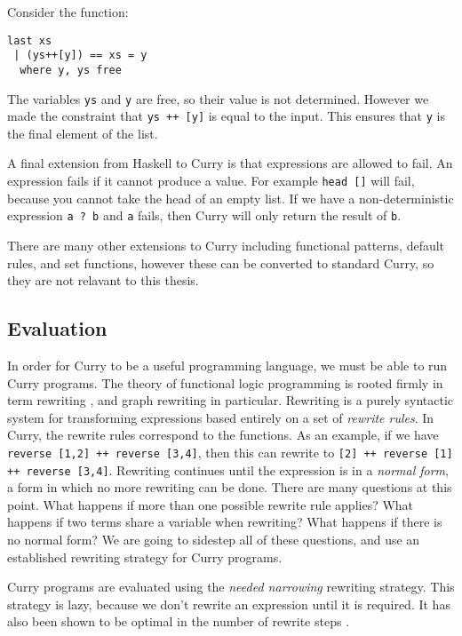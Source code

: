 Consider the function:
\begin{verbatim}
last xs
 | (ys++[y]) == xs = y
  where y, ys free
\end{verbatim}

The variables \texttt{ys} and \texttt y are free, so their value is not determined.
However we made the constraint that \texttt{ys ++ [y]} is equal to the input.
This ensures that \texttt y is the final element of the list.

A final extension from Haskell to Curry is that expressions are allowed to fail.
An expression fails if it cannot produce a value.
For example \texttt{head []} will fail, because you cannot take the head of an empty list.
If we have a non-deterministic expression \texttt{a ? b} and \texttt a fails, then Curry will only return the result of \texttt b.

There are many other extensions to Curry including functional patterns, default rules, and set functions, however
these can be converted to standard Curry, so they are not relavant to this thesis.


\subsection{Evaluation}

In order for Curry to be a useful programming language, we must be able to run Curry programs.
The theory of functional logic programming is rooted firmly in term rewriting \cite{}, and graph rewriting \cite{} in particular.
Rewriting is a purely syntactic system for transforming expressions based entirely on a set of \textit{rewrite rules}.
In Curry, the rewrite rules correspond to the functions.
As an example, if we have \texttt{reverse [1,2] ++ reverse [3,4]},
then this can rewrite to \texttt{[2] ++ reverse [1] ++ reverse [3,4]}.
Rewriting continues until the expression is in a \textit{normal form}, a form in which no more rewriting can be done.
There are many questions at this point.  What happens if more than one possible rewrite rule applies?
What happens if two terms share a variable when rewriting?  What happens if there is no normal form?
We are going to sidestep all of these questions, and use an established rewriting strategy for Curry programs.

Curry programs are evaluated using the \textit{needed narrowing} rewriting strategy.
This strategy is lazy, because we don't rewrite an expression until it is required.
It has also been shown to be optimal in the number of rewrite steps \cite{Needed}.

